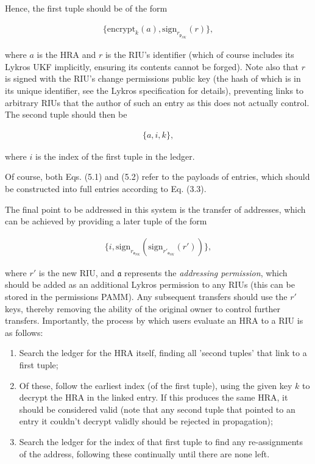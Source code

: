 \documentclass{extreport}
\begin{document}
Hence, the first tuple should be of the form

\begin{align*}
\{ \mathrm{encrypt}_k(a), \mathrm{sign}_{r_{\mathfrak{p}_{SK}}}(r) \}, \tag{5.1}
\end{align*}

where \(a\) is the HRA and \(r\) is the RIU's identifier (which of course includes its Lykros UKF implicitly, ensuring its contents cannot be forged). Note also that \(r\) is signed with the RIU's change permissions public key (the hash of which is in its unique identifier, see the Lykros specification for details), preventing links to arbitrary RIUs that the author of such an entry as this does not actually control. The second tuple should then be

\begin{align*}
\{ a, i, k \}, \tag{5.2}
\end{align*}

where \(i\) is the index of the first tuple in the ledger.

Of course, both Eqs. (5.1) and (5.2) refer to the payloads of entries, which should be constructed into full entries according to Eq. (3.3).

The final point to be addressed in this system is the transfer of addresses, which can be achieved by providing a later tuple of the form

\begin{align*}
\{ i, \mathrm{sign}_{r_{\mathfrak{a}_{SK}}}(\mathrm{sign}_{r'_{\mathfrak{a}_{SK}}}(r')) \}, \tag{5.3}
\end{align*}

where \(r'\) is the new RIU, and \(\mathfrak{a}\) represents the \emph{addressing permission}, which should be added as an additional Lykros permission to any RIUs (this can be stored in the permissions PAMM). Any subsequent transfers should use the \(r'\) keys, thereby removing the ability of the original owner to control further transfers. Importantly, the process by which users evaluate an HRA to a RIU is as follows:

\begin{enumerate}
\item Search the ledger for the HRA itself, finding all 'second tuples' that link to a first tuple;
\item Of these, follow the earliest index (of the first tuple), using the given key \(k\) to decrypt the HRA in the linked entry. If this produces the same HRA, it should be considered valid (note that any second tuple that pointed to an entry it couldn't decrypt validly should be rejected in propagation);
\item Search the ledger for the index of that first tuple to find any re-assignments of the address, following these continually until there are none left.
\end{enumerate}
\end{document}
